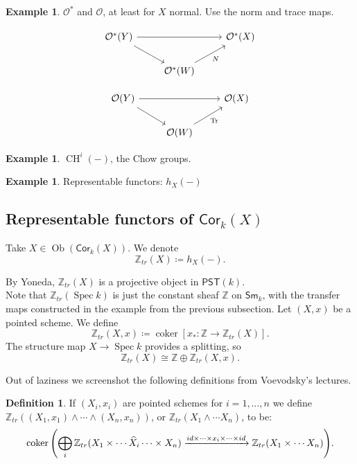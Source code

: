 \documentclass[leqno, openany]{memoir}
\theoremstyle{definition}
\newtheorem{defn}[thm]{Definition}
\newtheorem{exm}[thm]{Example}
\theoremstyle{remark}
\theoremstyle{plain}
\theoremstyle{definition}
\theoremstyle{remark}
\newcommand{\Z}{\mathbb{Z}}
\newcommand{\mc}[1]{\mathcal{#1}}
\newcommand{\ms}[1]{\mathsf{#1}}
\newcommand{\wh}[1]{\widehat{#1}}
\newcommand{\Sm}{\mathsf{Sm}}
\newcommand{\Cor}{\mathsf{Cor}}
\DeclareMathOperator{\Spec}{Spec}
\DeclareMathOperator{\CH}{CH}
\DeclareMathOperator{\Ob}{Ob}
\DeclareMathOperator{\coker}{coker}
\begin{document}
\begin{exm}
$\mc{O}^*$ and $\mc{O}$, at least for $X$ normal.  Use the norm and trace maps. 

\[\begin{tikzcd}
	{\mc{O}^*(Y)} && {\mc{O}^*(X)} \\
	& {\mc{O}^*(W)}
	\arrow[from=1-1, to=1-3]
	\arrow[from=1-1, to=2-2]
	\arrow["N"', from=2-2, to=1-3]
\end{tikzcd}\]

\[\begin{tikzcd}
	{\mc{O}(Y)} && {\mc{O}(X)} \\
	& {\mc{O}(W)}
	\arrow[from=1-1, to=1-3]
	\arrow[from=1-1, to=2-2]
	\arrow["\Tr"', from=2-2, to=1-3]
\end{tikzcd}\]
\end{exm}

\begin{exm}
$\CH^i(-)$, the Chow groups.
\end{exm}

\begin{exm}
Representable functors: $h_X(-)$
\end{exm} 

\subsection{Representable functors of $\Cor_k(X)$} 
Take $X\in \Ob(\Cor_k(X))$.  We denote
\[
\Z_{tr}(X)\coloneqq h_X(-).
\]

By Yoneda, $\Z_{tr}(X)$ is a projective object in $\ms{PST}(k)$. \\ 

Note that $\Z_{tr}(\Spec k)$ is just the constant sheaf $\Z$ on $\Sm_k$, with the transfer maps constructed in the example from the previous subsection.  Let $(X, x)$ be a pointed scheme.  We define 
\[
\Z_{tr}(X, x)\coloneqq \coker [x_*:\Z\rightarrow \Z_{tr}(X)].
\]
The structure map $X\rightarrow\Spec k$ provides a splitting, so 
\[
\Z_{tr}(X)\cong \Z\oplus \Z_{tr}(X, x).
\]

Out of laziness we screenshot the following definitions from Voevodsky's lectures.

\begin{defn}
    If $(X_i, x_i)$ are pointed schemes for $i = 1, \ldots, n$ we define $\Z_{tr}((X_1, x_1) \wedge \cdots \wedge (X_n, x_n))$, or $\Z_{tr}(X_1 \wedge \cdots X_n)$, to be:
    \[ \coker \qty(\bigoplus_i \Z_{tr}(X_1 \times \cdots \wh{X}_i \cdots \times X_n) \xrightarrow{id \times \cdots \times x_i \times \cdots \times id} \Z_{tr}(X_1 \times \cdots X_n)). \]
\end{defn}
\end{document}
